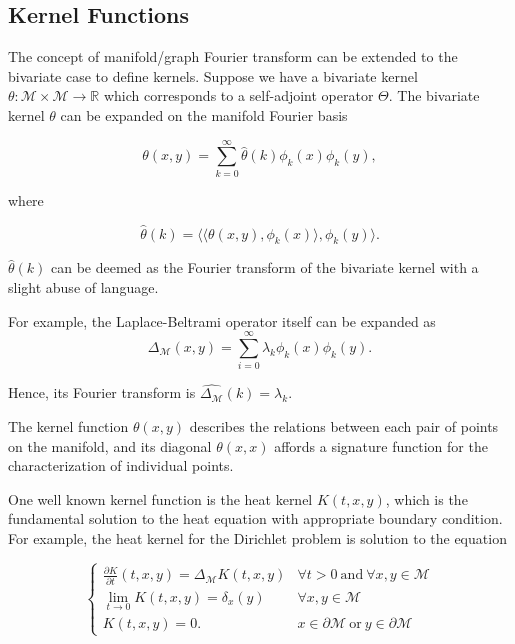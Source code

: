 \subsection{Kernel Functions}

The concept of manifold/graph Fourier transform can be extended to the 
bivariate case to define kernels. Suppose we have a bivariate kernel
$\theta:\mathcal{M}\times\mathcal{M}\to\mathbb{R}$ which corresponds to a
self-adjoint operator $\Theta$. The bivariate kernel $\theta$ can be expanded
on the manifold Fourier basis

\begin{equation}
\theta(x,y)=\sum_{k=0}^\infty \hat{\theta}(k)\phi_k(x)\phi_k(y),
\end{equation}

where

\begin{equation}
\hat{\theta}(k)=\langle\langle\theta(x,y),\phi_k(x)\rangle,\phi_k(y)\rangle.
\end{equation}

$\hat{\theta}(k)$ can be deemed as the Fourier transform of the bivariate kernel
with a slight abuse of language.

For example, the Laplace-Beltrami operator itself can be expanded as
\begin{equation}
\Delta_\mathcal{M}(x,y)=\sum_{i=0}^\infty \lambda_k\phi_k(x)\phi_k(y).
\end{equation}

Hence, its Fourier transform is $\widehat{\Delta_\mathcal{M}}(k)=\lambda_k$.

The kernel function $\theta(x,y)$ describes the relations between each pair of
points on the manifold, and its diagonal $\theta(x,x)$ affords a
signature function for the characterization of individual points.

One well known kernel function is the heat kernel $K(t,x,y)$, which is
the fundamental solution to the heat equation with appropriate boundary condition. 
For example, the heat kernel for the Dirichlet problem is solution to the equation

\begin{equation}
\left\{
  \begin{array}{ll}
    \frac{\partial K}{\partial t}(t,x,y) = \Delta_{\mathcal{M}} K(t,x,y) &\forall t>0 ~\text{and}~ \forall x,y\in\mathcal{M}\\
    \lim_{t\rightarrow 0}K(t,x,y)=\delta_x(y) &\forall x,y\in\mathcal{M} \\
    K(t,x,y)=0. & x\in\partial\mathcal{M} ~\text{or}~ y\in\partial\mathcal{M}
  \end{array}
\right.
\end{equation}

